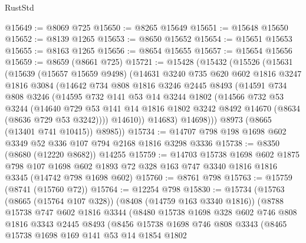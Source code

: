 \begin{lexlean}{RustStd}
\begin{coremodule}
@15649 := @8069 @725
@15650 := @8265 @15649
@15651 := @15648 @15650
@15652 := @8139 @1265
@15653 := @8650 @15652
@15654 := @15651 @15653
@15655 := @8163 @1265
@15656 := @8654 @15655
@15657 := @15654 @15656
@15659 := @8659 (@8661 @725)
@15721 := @15428
    (@15432
      (@15526
        (@15631
          (@15639
            (@15657 @15659 @9498)
            (@14631
              @3240
              @735
              @620
              @602
              @1816
              @3247
              @1816
              @3084
              (@14642
                @734
                @808
                @1816
                @3246
                @2445
                @8493
                (@14591
                  @734
                  @808
                  @3246
                  (@14595
                    @732
                    @141
                    @53
                    @14
                    @3244
                    @1802
                    (@14566
                      @732
                      @53
                      @3244
                      (@14640
                        @729
                        @53
                        @141
                        @14
                        @1816
                        @1802
                        @3242
                        @8492
                        @14670
                        (@8634 (@8636 @729 @53 @3242))))
                    @14610))
                @14683)
              @14698)))
        @8973
        (@8665 (@13401 @741 @10415))
        @8985))
@15734 := @14707 @798 @198 @1698 @602 @3349 @52 @336 @107 @794 @2168 @1816 @3298 @3336
@15738 := @8350 (@8680 (@12220 @8682)) @14255
@15759 := @14703
    @15738
    @1698
    @602
    @1875
    @798
    @107
    @1698
    @602
    @1893
    @72
    @328
    @163
    @747
    @3340
    @1816
    @1816
    @3345
    (@14742 @798 @1698 @602)
@15760 := @8761 @798
@15763 := @15759 (@8741 (@15760 @72))
@15764 := @12254 @798
@15830 := @15734
    (@15763
      (@8665 (@15764 @107 @328))
      (@8408 (@14759 @163 @3340 @1816))
      (@8788
        @15738
        @747
        @602
        @1816
        @3344
        (@8480
          @15738
          @1698
          @328
          @602
          @746
          @808
          @1816
          @3343
          @2445
          @8493
          (@8456
            @15738
            @1698
            @746
            @808
            @3343
            (@8465
              @15738
              @1698
              @169
              @141
              @53
              @14
              @1854
              @1802

\end{coremodule}
\end{lexlean}
